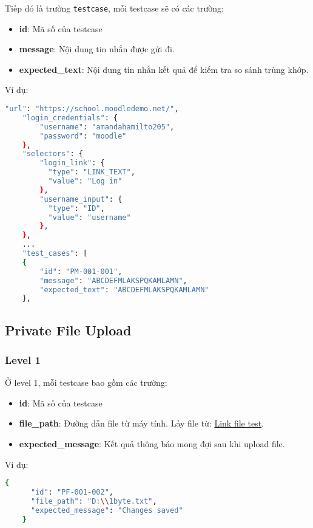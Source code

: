 \noindent Tiếp đó là trường \texttt{testcase}, mỗi testcase sẽ có các trường:
\begin{itemize}
    \item \textbf{id}: Mã số của testcase
    \item \textbf{message}: Nội dung tin nhắn được gửi đi.
    \item \textbf{expected\_text}: Nội dung tin nhắn kết quả để kiếm tra so sánh trùng khớp.
\end{itemize}

\noindent Ví dụ:
\begin{lstlisting}[language=bash]
    "url": "https://school.moodledemo.net/",
    "login_credentials": {
        "username": "amandahamilto205",
        "password": "moodle"
    },
    "selectors": {
        "login_link": {
          "type": "LINK_TEXT",
          "value": "Log in"
        },
        "username_input": {
          "type": "ID",
          "value": "username"
        },
    },
    ...
    "test_cases": [
    {
        "id": "PM-001-001",
        "message": "ABCDEFMLAKSPQKAMLAMN",
        "expected_text": "ABCDEFMLAKSPQKAMLAMN"
    },
\end{lstlisting}

\subsection{Private File Upload}
\subsubsection{Level 1}
Ở level 1, mỗi testcase bao gồm các trường:
\begin{itemize}
    \item \textbf{id}: Mã số của testcase
    \item \textbf{file\_path}: Đường dẫn file từ máy tính. Lấy file từ: \href{https://drive.google.com/drive/folders/1mAcoKv5-AXE3Vms1LvrvOoVR0mKdqAaT?usp=sharing}{Link file test}.
    \item \textbf{expected\_message}: Kết quả thông báo mong đợi sau khi upload file.
\end{itemize}
\noindent Ví dụ:
\begin{lstlisting}[language=bash]
    {
      "id": "PF-001-002",
      "file_path": "D:\\1byte.txt",
      "expected_message": "Changes saved"
    }
\end{lstlisting}

